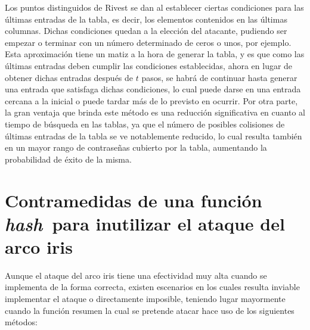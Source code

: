 \documentclass[12pt,spanish,listoffigures,listoftables,listofalgorithms]{tfgetsinf}
\newcommand{\hash}{\textit{hash}}
\begin{document}
Los puntos distinguidos de Rivest se dan al establecer ciertas condiciones para las últimas entradas de la tabla, es decir, los elementos contenidos en las últimas columnas. Dichas condiciones quedan a la elección del atacante, pudiendo ser empezar o terminar con un número determinado de ceros o unos, por ejemplo. Esta aproximación tiene un matiz a la hora de generar la tabla, y es que como las últimas entradas deben cumplir las condiciones establecidas, ahora en lugar de obtener dichas entradas después de $t$ pasos, se habrá de continuar hasta generar una entrada que satisfaga dichas condiciones, lo cual puede darse en una entrada cercana a la inicial o puede tardar más de lo previsto en ocurrir. Por otra parte, la gran ventaja que brinda este método es una reducción significativa en cuanto al tiempo de búsqueda en las tablas, ya que el número de posibles colisiones de últimas entradas de la tabla se ve notablemente reducido, lo cual resulta también en un mayor rango de contraseñas cubierto por la tabla, aumentando la probabilidad de éxito de la misma.

\section{Contramedidas de una función \hash~para inutilizar el ataque del arco iris} \label{salt}

Aunque el ataque del arco iris tiene una efectividad muy alta cuando se implementa de la forma correcta, existen escenarios en los cuales resulta inviable implementar el ataque o directamente imposible, teniendo lugar mayormente cuando la función resumen la cual se pretende atacar hace uso de los siguientes métodos:
\end{document}
